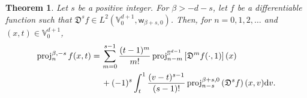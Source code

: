 \documentclass{amsart}
\newtheorem{thm}{Theorem}[section]
\theoremstyle{remark}
\def\d{\mathrm{d}}
\def\sph{{\mathbb{S}^{d-1}}}
\def\sw{{\mathsf w}}
\def\fD{{\mathfrak D}}
\def\b{{\beta}}
\def\o{{\omega}}
\def\s{\sigma}
\def\VV{{\mathbb V}}
\def\proj{\operatorname{proj}}
\begin{document}
\begin{thm} \label{thm:proj-s=int}
Let $s$ be a positive integer. For $\b > -d-s$, let $f$ be a differentiable function such that
$\fD^s f \in L^2(\VV_0^{d+1}, \sw_{\b+s,0})$. Then, for $n =0,1,2,\ldots$ and $(x,t) \in \VV_0^{d+1}$,
\begin{align}\label{eq:proj-s=int}
   \proj_n^{\b,-s} f(x,t) = \,& \sum_{m=0}^{s-1} \frac{(t-1)^m}{m!} \proj_{n-m}^\sph  \left[\fD^m f(\cdot,1)\right](x) \\
        & + (-1)^s \int_{t}^{1} \frac{(v-t)^{s-1}}{(s-1)!} \proj_{n-s}^{\b+s,0} \left(\fD^s f\right) (x, v) \d v. \notag
\end{align}
\end{thm}
\end{document}
